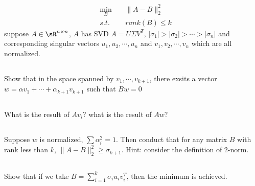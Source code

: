 \documentclass{article}%
\begin{document}
$$
\begin{aligned}
    &\min_B\ \ \ \ \ &\|A - B\|_2^2\\
    &s.t. &rank(B) \le k
\end{aligned}
$$
suppose $A\in\sR^{n\times n}$, $A$ has SVD $A=U\Sigma V^T$, $|\sigma_1|>|\sigma_2|>\cdots>|\sigma_n|$ and corresponding singular vectors $u_1,u_2,\cdots,u_n$ and $v_1,v_2,\cdots,v_n$ which are all normalized.

\subsection{}
Show that in the space spanned by $v_1,\cdots,v_{k+1}$, there exsits a vector $w=\alpha v_1+\cdots +\alpha_{k+1} v_{k+1}$ such that $Bw=0$
\subsection{}
What is the result of $Av_i$? what is the result of $Aw$?
\subsection{}
Suppose $w$ is normalized, $\sum \alpha_i^2=1$. 
Then conduct that for any matrix $B$ with rank less than $k$, $\|A-B\|_2^2\geq \sigma_{k+1}$. Hint: consider the definition of 2-norm.

\subsection{}
Show that if we take $B=\sum_{i=1}^k \sigma_i u_i v_i^T$, then the minimum is achieved.
\end{document}
